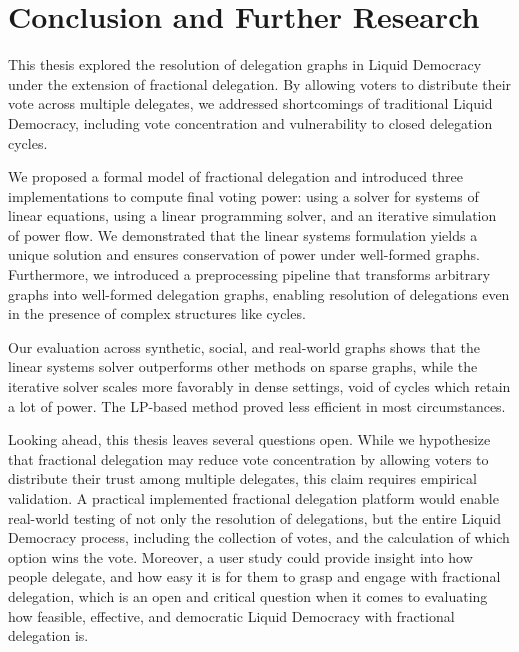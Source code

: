 
\chapter{Conclusion and Further Research}
\label{chap:conclusion}

This thesis explored the resolution of delegation graphs in Liquid Democracy under the extension of fractional delegation. By allowing voters to distribute their vote across multiple delegates, we addressed shortcomings of traditional Liquid Democracy, including vote concentration and vulnerability to closed delegation cycles.

We proposed a formal model of fractional delegation and introduced three implementations to compute final voting power: using a solver for systems of linear equations, using a linear programming solver, and an iterative simulation of power flow. We demonstrated that the linear systems formulation yields a unique solution and ensures conservation of power under well-formed graphs. Furthermore, we introduced a preprocessing pipeline that transforms arbitrary graphs into well-formed delegation graphs, enabling resolution of delegations even in the presence of complex structures like cycles.

Our evaluation across synthetic, social, and real-world graphs shows that the linear systems solver outperforms other methods on sparse graphs, while the iterative solver scales more favorably in dense settings, void of cycles which retain a lot of power. The LP-based method proved less efficient in most circumstances. 

Looking ahead, this thesis leaves several questions open. While we hypothesize that fractional delegation may reduce vote concentration by allowing voters to distribute their trust among multiple delegates, this claim requires empirical validation. A practical implemented fractional delegation platform would enable real-world testing of not only the resolution of delegations, but the entire Liquid Democracy process, including the collection of votes, and the calculation of which option wins the vote. Moreover, a user study could provide insight into how people delegate, and how easy it is for them to grasp and engage with fractional delegation, which is an open and critical question when it comes to evaluating how feasible, effective, and democratic Liquid Democracy with fractional delegation is. 
